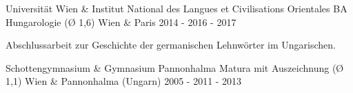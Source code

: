 \begin{cventries}
  \cventry
    {Universität Wien \& Institut National des Langues et Civilisations Orientales} %
    {BA Hungarologie (Ø 1,6)} %
    {Wien \& Paris} %
    {2014 - 2016 - 2017} %
    {
      \begin{cvitems} %
        \item {Abschlussarbeit zur Geschichte der germanischen Lehnwörter im Ungarischen.}
      \end{cvitems}
    }
        
  \cventry
    {Schottengymnasium \& Gymnasium Pannonhalma} %
    {Matura mit Auszeichnung (Ø 1,1)} %
    {Wien \& Pannonhalma (Ungarn)} %
    {2005 - 2011 - 2013} %
    {}
\end{cventries}
